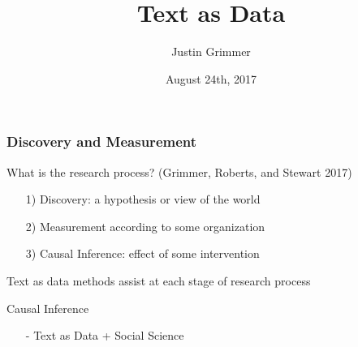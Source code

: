 \documentclass[xcolor=dvipsnames]{beamer}
\title[Text as Data] %
{Text as Data}
\author{Justin Grimmer}
\institute[University of Chicago]{Associate Professor\\Department of Political Science \\  University of Chicago}
\date{August 24th, 2017}%
\begin{document}
\begin{frame}
\titlepage
\end{frame}



\begin{frame}
\frametitle{Discovery and Measurement}

What is the research process? (Grimmer, Roberts, and Stewart 2017)

\begin{itemize}
  \item[1)] \alert{Discovery}: a hypothesis or view of the world
  \item[2)] \alert{Measurement} according to some organization
  \item[3)] \alert{Causal Inference}: effect of some intervention
\end{itemize}

Text as data methods assist at each stage of research process

\end{frame}



\begin{frame}

\huge

Causal Inference

\end{frame}



\begin{frame}


\Huge

  \begin{itemize}
    \item[-] Text as Data +  Social Science  \pause \medskip
     \pause
     \pause
     \pause
  \end{itemize}


\end{frame}
\end{document}
